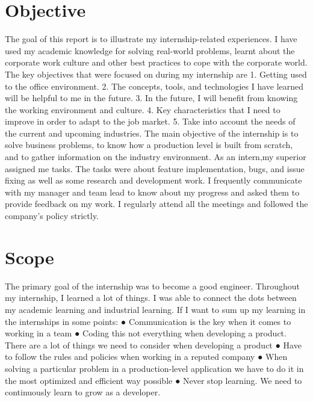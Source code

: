 \section{Objective}
\begin{flushleft}
    The goal of this report is to illustrate my internship-related experiences. I have used my
academic knowledge for solving real-world problems, learnt about the corporate work culture
and other best practices to cope with the corporate world. The key objectives that were focused
on during my internship are
1. Getting used to the office environment.
2. The concepts, tools, and technologies I have learned will be helpful to me in the future.
3. In the future, I will benefit from knowing the working environment and culture.
4. Key characteristics that I need to improve in order to adapt to the job market.
5. Take into account the needs of the current and upcoming industries.
The main objective of the internship is to solve business problems, to know how a production
level is built from scratch, and to gather information on the industry environment. As an intern,my superior assigned me tasks. The tasks were about feature implementation, bugs, and issue
fixing as well as some research and development work. I frequently communicate with my
manager and team lead to know about my progress and asked them to provide feedback on my
work. I regularly attend all the meetings and followed the company’s policy strictly.

\end{flushleft}

\section{Scope}
\begin{flushleft}
    The primary goal of the internship was to become a good engineer. Throughout my internship, I
learned a lot of things. I was able to connect the dots between my academic learning and
industrial learning. If I want to sum up my learning in the internships in some points:
● Communication is the key when it comes to working in a team
● Coding this not everything when developing a product. There are a lot of things we need
to consider when developing a product
● Have to follow the rules and policies when working in a reputed company
● When solving a particular problem in a production-level application we have to do it in
the most optimized and efficient way possible
● Never stop learning. We need to continuously learn to grow as a developer.
\end{flushleft}
